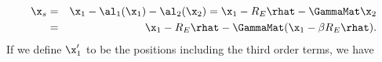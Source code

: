 \begin{eqnarray}
\x_s &=& \x_1 - \al_1(\x_1) - \al_2(\x_2) = \x_1 - R_E \rhat-  \GammaMat \x_2 \nonumber\\
&=& \x_1 - R_E \rhat -  \GammaMat (\x_1 - \beta R_E \rhat).
\label{eqn:backgroundorder2}
\end{eqnarray}
If we define $\x_1'$ to be the positions including the third order terms, we have
  
  
  
  